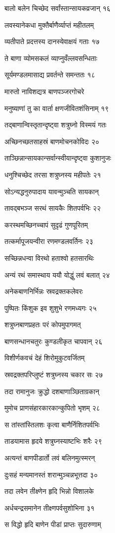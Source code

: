 बालो बलेन चिच्छेद सर्वांस्तान्सायकव्रजान् १६

लवस्यानेकधा मुक्तैर्बाणैर्व्याप्तं महीतलम्

व्यतीपाते प्रदत्तस्य दानस्येवाक्षयं गताः १७

ते बाणा व्योमसकलं व्याप्नुवँल्लवसन्धिताः

सूर्यमण्डलमासाद्य प्रवर्तन्ते समन्ततः १८

मारुतो नाविशद्यत्र बाणपञ्जरगोचरे

मनुष्याणां तु का वार्ता क्षणजीवितशंसिनाम् १९

तद्बाणान्विस्तृतान्दृष्ट्वा शत्रुघ्नो विस्मयं गतः

अच्छिनच्छतसाहस्रं बाणमोचनकोविदः २०

ताञ्छिन्नान्सायकान्सर्वान्स्वीयान्दृष्ट्वा कुशानुजः

धनुश्चिच्छेद तरसा शत्रुघ्नस्य महीपतेः २१

सोऽन्यद्धनुरुपादाय यावन्मुञ्चति सायकान्

तावद्बभञ्ज सरथं सायकैः शितपर्वभिः २२

करस्थमच्छिनच्चापं सुदृढं गुणपूरितम्

तत्कर्मापूजयन्वीरा रणमण्डलवर्तिनः २३

सच्छिन्नधन्वा विरथो हताश्वो हतसारथिः

अन्यं रथं समास्थाय ययौ योद्धुं लवं बलात् २४

अनेकबाणनिर्भिन्नः स्रवद्रक्तकलेवरः

पुष्पितः किंशुक इव शुशुभे रणमध्यगः २५

शत्रुघ्नबाणप्रहतः परं कोपमुपागमत्

बाणसन्धानचतुरः कुण्डलीकृत चापवान् २६

विशीर्णकवचं देहं शिरोमुकुटवर्जितम्

स्रवद्रक्तपरिप्लुष्टं शत्रुघ्नस्य चकार सः २७

तदा रामानुजः क्रुद्धो दशबाणाञ्छिताग्रकान्

मुमोच प्राणसंहारकारकान्कुपितो भृशम् २८

स तांस्तांस्तिलशः कृत्वा बाणैर्निशितपर्वभिः

ताडयामास हृदये शत्रुघ्नस्याष्टभिः शरैः २९

अत्यन्तं बाणपीडार्तो लवं बलिनमुत्स्मरन्

दुःसहं मन्यमानस्तं शरान्मुञ्चन्नभूत्तदा ३०

तदा लवेन तीक्ष्णेन हृदि भिन्नो विशालके

अर्धचन्द्रसमानेन तीक्ष्णपर्वसुशोभिना ३१

स विद्धो हृदि बाणेन पीडां प्राप्तः सुदारुणाम्

